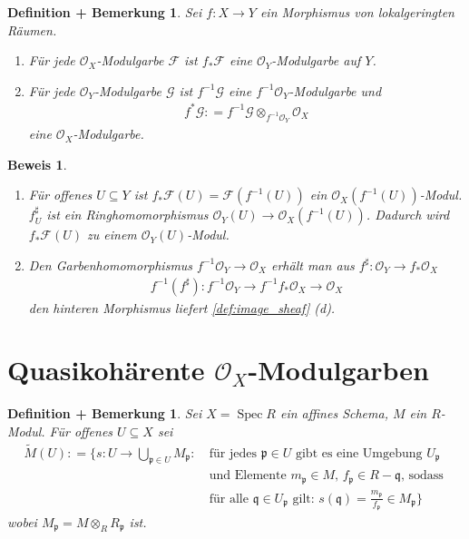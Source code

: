 \documentclass[a4paper,oneside]{scrbook}
\theoremstyle{break}
\newtheorem{DefBem}[Def]{Definition + Bemerkung}
\theoremstyle{nonumberbreak}
\theoremstyle{nonumberplain}
\newtheorem{Bew}{Beweis}
\theoremstyle{break}
\newcommand{\defeqr}[0]{\mathrel{\mathop:}=}
\newcommand{\Spec}{%
	\ensuremath{\operatorname{Spec}}%
}
\begin{document}
\begin{DefBem}
  \label{defbem:9.4}
  Sei $f:X\to Y$ ein Morphismus von lokalgeringten Räumen.
  \begin{enumerate}
  \item Für jede $\mathcal O_X$-Modulgarbe $\mathcal F$ ist $f_\ast\mathcal F$ eine $\mathcal O_Y$-Modulgarbe auf $Y$.
  \item Für jede $\mathcal O_Y$-Modulgarbe $\mathcal G$ ist $f^{-1}\mathcal G$ eine $f^{-1}\mathcal O_Y$-Modulgarbe und
    \begin{align*}
      f^\ast\mathcal G\defeqr f^{-1}\mathcal G\otimes_{f^{-1} \mathcal O_Y}\mathcal O_X
    \end{align*}
    eine $\mathcal O_X$-Modulgarbe.
  \end{enumerate}
\end{DefBem}

\begin{Bew}
  \begin{enumerate}
  \item Für offenes $U\subseteq Y$ ist $f_\ast \mathcal F(U)=\mathcal F(f^{-1}(U))$ ein $\mathcal O_X(f^{-1}(U))$-Modul.
    $f^\sharp_U$ ist ein Ringhomomorphismus $\mathcal O_Y(U)\to\mathcal O_X(f^{-1}(U))$. Dadurch wird $f_\ast\mathcal F(U)$
    zu einem $\mathcal O_Y(U)$-Modul.
  \item Den Garbenhomomorphismus $f^{-1}\mathcal O_Y\to\mathcal O_X$ erhält man aus $f^\sharp:\mathcal O_Y\to f_\ast\mathcal O_X$
    \begin{align*}
      f^{-1}(f^\sharp):f^{-1}\mathcal O_Y\to f^{-1}f_\ast\mathcal O_X\to\mathcal O_X
    \end{align*}
    den hinteren Morphismus liefert \ref{def:image_sheaf} (d).
  \end{enumerate}
\end{Bew}

\section{Quasikohärente $\mathcal O_X$-Modulgarben}
\begin{DefBem}
  \label{defbem:10.1}
  Sei $X=\Spec R$ ein affines Schema, $M$ ein $R$-Modul. Für offenes $U\subseteq X$ sei
  \begin{align*}
    \widetilde{M}(U)\defeqr\{s:U\to\bigcup_{\mathfrak p\in U}M_{\mathfrak p}:~ &\text{für jedes $\mathfrak p\in U$ gibt es eine Umgebung $U_{\mathfrak p}$} \\
    &\text{und Elemente $m_{\mathfrak p}\in M$, $f_{\mathfrak p}\in R-\mathfrak q$, sodass } \\
    & \text{für alle $\mathfrak q\in U_{\mathfrak p}$ gilt: $s(\mathfrak q)=\frac{m_{\mathfrak p}}{f_{\mathfrak p}}\in M_{\mathfrak p}$}\}
  \end{align*}
  wobei $M_{\mathfrak p}=M\otimes_RR_{\mathfrak p}$ ist.
\end{DefBem}
\end{document}
